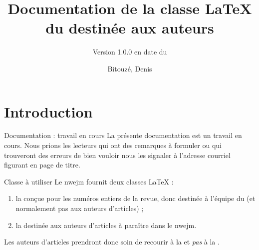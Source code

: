\documentclass[english,nolocaltoc]{nwejmart}
\newcommand{\releaseversion}{1.0.0}
\newtheorem[style=definition]{fait}
\newtheorem[title=expérience]{experience}
\newtheorem[title-plural=anneaux]{anneau}
\newtheorem[title=idéal,title-plural=idéaux]{ideal}
\begin{document}
\title[Documentation de la classe \LaTeX{} du
\texorpdfstring{\nwejm}{NWEJM}]{Documentation de la classe \LaTeX{} du \nwejm*{}
  destinée aux auteurs}%
%
\subtitle[Version \releaseversion{} (\DTMusedate{release-date})]{\small Version \releaseversion{} en
  date du }%
%
\author[%
affiliation={%
  Université du Littoral Côte d'Opale, Laboratoire de mathématiques pures et
  appliquées (\nolinkurl{denis.bitouze@univ-littoral.fr})%
},%
]{Bitouzé, Denis}
%
\maketitle
%
\etocarticlestylenomarks
\localtableofcontents
%

\section{Introduction}
\label{sec-introduction}

\begin{dbremark}{Documentation : travail en cours}{}
  La présente documentation est un travail en cours. Nous prions les lecteurs
  qui ont des remarques à formuler ou qui trouveront des erreurs de bien vouloir
  nous les signaler à l'adresse courriel figurant en page de titre.
\end{dbremark}

\begin{dbwarning}{Classe à utiliser}{}
  Le \gls{nwejm} fournit deux classes \LaTeX{} :
  \begin{enumerate}
  \item la \nwejmcl{} conçue pour les numéros entiers de la revue, donc destinée
    à l'équipe du \nwejm{} (et normalement pas aux auteurs d'articles) ;
  \item la \nwejmauthorcl{} destinée aux auteurs d'articles à paraître dans le
    \gls{nwejm}.
  \end{enumerate}
  Les auteurs d'articles prendront donc soin de recourir à la \nwejmauthorcl{}
  et \emph{pas} à la \nwejmcl{}.
\end{dbwarning}
\end{document}
